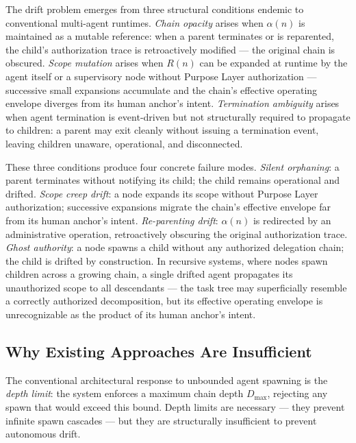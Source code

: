 The drift problem emerges from three structural conditions endemic to conventional multi-agent runtimes. \emph{Chain opacity} arises when $\alpha(n)$ is maintained as a mutable reference: when a parent terminates or is reparented, the child's authorization trace is retroactively modified — the original chain is obscured. \emph{Scope mutation} arises when $R(n)$ can be expanded at runtime by the agent itself or a supervisory node without Purpose Layer authorization — successive small expansions accumulate and the chain's effective operating envelope diverges from its human anchor's intent. \emph{Termination ambiguity} arises when agent termination is event-driven but not structurally required to propagate to children: a parent may exit cleanly without issuing a termination event, leaving children unaware, operational, and disconnected.

These three conditions produce four concrete failure modes. \emph{Silent orphaning}: a parent terminates without notifying its child; the child remains operational and drifted. \emph{Scope creep drift}: a node expands its scope without Purpose Layer authorization; successive expansions migrate the chain's effective envelope far from its human anchor's intent. \emph{Re-parenting drift}: $\alpha(n)$ is redirected by an administrative operation, retroactively obscuring the original authorization trace. \emph{Ghost authority}: a node spawns a child without any authorized delegation chain; the child is drifted by construction. In recursive systems, where nodes spawn children across a growing chain, a single drifted agent propagates its unauthorized scope to all descendants — the task tree may superficially resemble a correctly authorized decomposition, but its effective operating envelope is unrecognizable as the product of its human anchor's intent.

\subsection{Why Existing Approaches Are Insufficient}

The conventional architectural response to unbounded agent spawning is the \emph{depth limit}: the system enforces a maximum chain depth $D_{\max}$, rejecting any spawn that would exceed this bound. Depth limits are necessary — they prevent infinite spawn cascades — but they are structurally insufficient to prevent autonomous drift.

